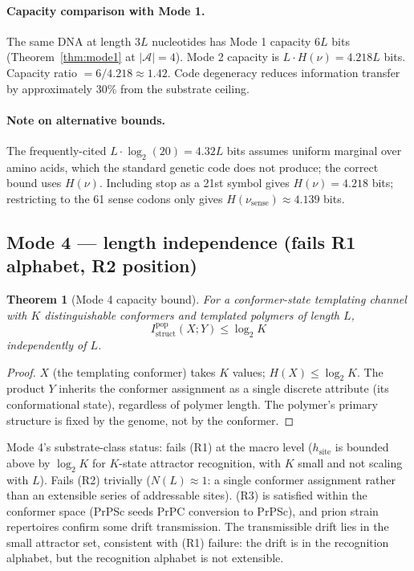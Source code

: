 \documentclass[11pt]{article}
\theoremstyle{plain}
\newtheorem{theorem}{Theorem}
\theoremstyle{definition}
\newcommand{\Istructpop}{I_{\mathrm{struct}}^{\mathrm{pop}}}
\begin{document}
\paragraph{Capacity comparison with Mode 1.} The same DNA at length $3L$ nucleotides has Mode 1 capacity $6L$ bits (Theorem~\ref{thm:mode1} at $|\mathcal{A}| = 4$). Mode 2 capacity is $L \cdot H(\nu) = 4.218L$ bits. Capacity ratio $= 6/4.218 \approx 1.42$. Code degeneracy reduces information transfer by approximately 30\% from the substrate ceiling.

\paragraph{Note on alternative bounds.} The frequently-cited $L \cdot \log_2(20) = 4.32L$ bits assumes uniform marginal over amino acids, which the standard genetic code does not produce; the correct bound uses $H(\nu)$. Including stop as a 21st symbol gives $H(\nu) = 4.218$ bits; restricting to the 61 sense codons only gives $H(\nu_{\mathrm{sense}}) \approx 4.139$ bits.

\subsection{Mode 4 --- length independence (fails R1 alphabet, R2 position)}

\begin{theorem}[Mode 4 capacity bound]
\label{thm:mode4}
For a conformer-state templating channel with $K$ distinguishable conformers and templated polymers of length $L$,
\[
\Istructpop(X; Y) \le \log_2 K
\]
independently of $L$.
\end{theorem}

\begin{proof}
$X$ (the templating conformer) takes $K$ values; $H(X) \le \log_2 K$. The product $Y$ inherits the conformer assignment as a single discrete attribute (its conformational state), regardless of polymer length. The polymer's primary structure is fixed by the genome, not by the conformer.
\end{proof}

Mode 4's substrate-class status: fails (R1) at the macro level ($h_{\mathrm{site}}$ is bounded above by $\log_2 K$ for $K$-state attractor recognition, with $K$ small and not scaling with $L$). Fails (R2) trivially ($N(L) \approx 1$: a single conformer assignment rather than an extensible series of addressable sites). (R3) is satisfied within the conformer space (PrPSc seeds PrPC conversion to PrPSc), and prion strain repertoires confirm some drift transmission. The transmissible drift lies in the small attractor set, consistent with (R1) failure: the drift is in the recognition alphabet, but the recognition alphabet is not extensible.
\end{document}
